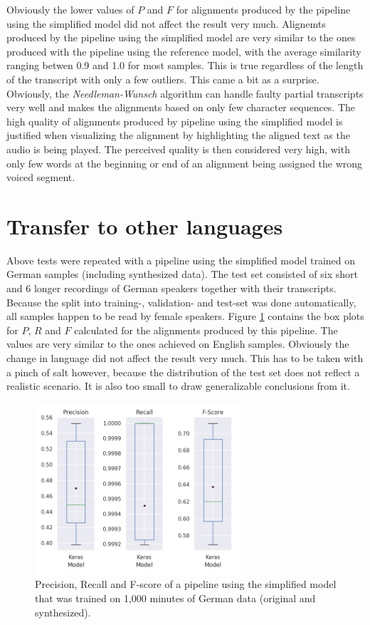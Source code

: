 \documentclass[letterpaper]{article}
\begin{document}
Obviously the lower values of $P$ and $F$ for alignments produced by the pipeline using the simplified model did not affect the result very much. Alignemts produced by the pipeline using the simplified model are very similar to the ones produced with the pipeline using the reference model, with the average similarity ranging betwen 0.9 and 1.0 for most samples. This is true regardless of the length of the transcript with only a few outliers. This came a bit as a surprise. Obviously, the \textit{Needleman-Wunsch} algorithm can handle faulty partial transcripts very well and makes the alignments based on only few character sequences. The high quality of alignments produced by pipeline using the simplified model is justified when visualizing the alignment by highlighting the aligned text as the audio is being played. The perceived quality is then considered very high, with only few words at the beginning or end of an alignment being assigned the wrong voiced segment.

\section{Transfer to other languages}

Above tests were repeated with a pipeline using the simplified model trained on German samples (including synthesized data). The test set consisted of six short and 6 longer recordings of German speakers together with their transcripts. Because the split into training-, validation- and test-set was done automatically, all samples happen to be read by female speakers. Figure \ref{boxplot_de} contains the box plots for $P$, $R$ and $F$ calculated for the alignments produced by this pipeline. The values are very similar to the ones achieved on English samples. Obviously the change in language did not affect the result very much. This has to be taken with a pinch of salt however, because the distribution of the test set does not reflect a realistic scenario. It is also too small to draw generalizable conclusions from it.

\begin{figure}[!htb]
	\begin{center}
		\includegraphics[width=3in]{boxplot_de.png}
		\caption{Precision, Recall and F-score of a pipeline using the simplified model that was trained on 1,000 minutes of German data (original and synthesized).}
		\label{boxplot_de}
	\end{center}
\end{figure}
\end{document}
